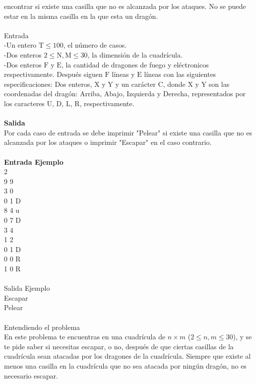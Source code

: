 \documentclass[12pt]{article}
\begin{document}
encontrar si existe una casilla que no es alcanzada por los ataques. No se puede estar en la misma casilla en la que
esta un drag\'on.\\
\\
\textrm{\large Entrada}
\\-Un entero $\mathrm{T \leq 100}$, el n\'umero de casos.
\\-Dos enteros $\mathrm{2 \leq N, M \leq 30}$, la dimensi\'on de la cuadr\'icula.
\\-Dos enteros $\mathrm{F}$ y $\mathrm{E}$, la cantidad de dragones de fuego y el\'ectronicos respectivamente.
Despu\'es siguen $\mathrm{F}$ l\'ineas y $\mathrm{E}$ l\'ineas con las siguientes especificaciones: Dos enteros,
$\mathrm{X}$ y $\mathrm{Y}$ y un car\'acter $\mathrm{C}$, donde $\mathrm{X}$ y $\mathrm{Y}$ son las coordenadas 
del drag\'on: Arriba, Abajo, Izquierda y Derecha, representados por los caracteres $\mathrm{U}$, $\mathrm{D}$,
$\mathrm{L}$, $\mathrm{R}$, respectivamente.\\
\\
\textbf{\large Salida}
\\Por cada caso de entrada se debe imprimir "Pelear" si existe una casilla que no es alcanzada por los ataques o
imprimir "Escapar" en el caso contrario.\\
\\
\textbf{\large Entrada Ejemplo}
\\
2\\
9 9\\
3 0\\
0 1 D\\
8 4 u\\
0 7 D\\
3 4\\
1 2\\
0 1 D\\
0 0 R\\
1 0 R\\
\\
\textbf{}{\large Salida Ejemplo}
\\
Escapar\\
Pelear\\
\\
\textbf{}{\large Entendiendo el problema}\\
En este problema te encuentras en una cuadrícula de $n \times m$ ($2 \leq n, m \leq 30$), y se te pide saber si necesitas escapar, o no, después de que ciertas casillas de la cuadrícula sean atacadas por los dragones de la cuadrícula. Siempre que existe al menos una casilla en la cuadrícula que no sea atacada por ningún dragón, no es necesario escapar.\\
\end{document}
